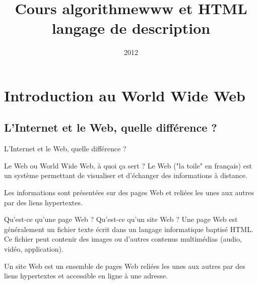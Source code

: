 \documentclass[hyperref=dvips,11pt,svgnames, smaller,  aspectratio=169]{beamer}
\institute{Lycée pablo neruda}
\date{2012}
\title{Cours algorithme}
\begin{document}
\title{www et HTML langage de description}

\section{Introduction au World Wide Web}
\subsection{L'Internet et le Web, quelle différence ?}
\begin{frame}
\begin{block}{L'Internet et le Web, quelle différence ?}
	\only<1>{\vspace{1.8cm}}
\end{block}
\end{frame}

\begin{frame}
\begin{block}{Le Web ou World Wide Web, à quoi ça sert ?}
Le Web ("la toile" en français) est un système permettant de visualiser et d'échanger des informations à distance.

Les informations sont présentées sur des pages Web et reliées les unes aux autres par des liens hypertextes.
	\end{block}
\end{frame}

\begin{frame}
	\begin{block}{Qu'est-ce qu'une page Web ? Qu'est-ce qu'un site Web ?}
Une page Web est généralement un fichier texte écrit dans un langage informatique baptisé HTML.\\
Ce fichier peut contenir des images ou d'autres contenus multimédias (audio, vidéo, application).

Un site Web est un ensemble de pages Web reliées les unes aux autres par des liens hypertextes et accessible en ligne à une adresse.
	\end{block}
\end{frame}
\end{document}
